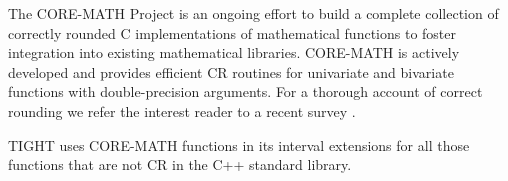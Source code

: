 The CORE-MATH Project \cite{Sibidanov2022} is an ongoing effort to build a complete collection of correctly rounded C implementations of mathematical functions to foster integration into existing mathematical libraries. 
CORE-MATH is actively developed and provides efficient CR routines for univariate and bivariate functions with double-precision arguments.
For a thorough account of correct rounding we refer the interest reader to a recent survey \cite{CRsurvey}.

TIGHT uses CORE-MATH functions in its interval extensions for all those functions that are not CR in the C++ standard library.

